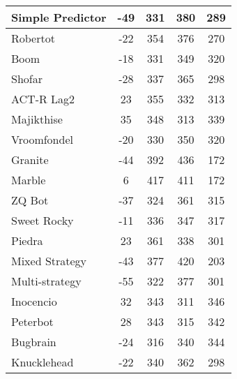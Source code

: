 \begin{table*}
\begin{tabular}{|l|c|c|c|c|}
Simple Predictor & -49 & 331 & 380 & 289 \\ \hline 
Robertot & -22 & 354 & 376 & 270 \\ \hline 
Boom & -18 & 331 & 349 & 320 \\ \hline 
Shofar & -28 & 337 & 365 & 298 \\ \hline 
ACT-R Lag2 & 23 & 355 & 332 & 313 \\ \hline 
Majikthise & 35 & 348 & 313 & 339 \\ \hline 
Vroomfondel & -20 & 330 & 350 & 320 \\ \hline 
Granite & -44 & 392 & 436 & 172 \\ \hline 
Marble & 6 & 417 & 411 & 172 \\ \hline 
ZQ Bot & -37 & 324 & 361 & 315 \\ \hline 
Sweet Rocky & -11 & 336 & 347 & 317 \\ \hline 
Piedra & 23 & 361 & 338 & 301 \\ \hline 
Mixed Strategy & -43 & 377 & 420 & 203 \\ \hline 
Multi-strategy & -55 & 322 & 377 & 301 \\ \hline 
Inocencio & 32 & 343 & 311 & 346 \\ \hline 
Peterbot & 28 & 343 & 315 & 342 \\ \hline 
Bugbrain & -24 & 316 & 340 & 344 \\ \hline 
Knucklehead & -22 & 340 & 362 & 298 \\ \hline
        \end{tabular}
    \end{table*}